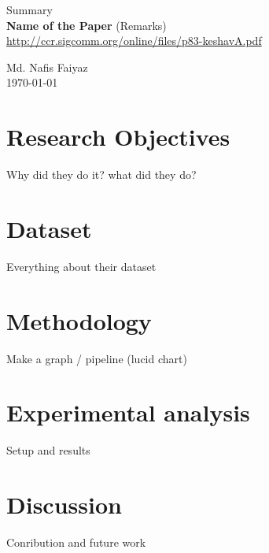 \documentclass{article}
\begin{document}
\begin{titlepage}

    \begin{center}
        
        {\LARGE
            Summary\\
            \vspace{0.5cm}
            \textbf{Name of the Paper} (Remarks)
        }\\
        \vspace{1cm}
        \url{http://ccr.sigcomm.org/online/files/p83-keshavA.pdf}
        
        \vfill
        
        {\large Md. Nafis Faiyaz}\\
        \today
        
    \end{center}
    
\end{titlepage}

\section{Research Objectives}
    Why did they do it? what did they do?
    
\section{Dataset}
    Everything about their dataset
    
\section{Methodology}
    Make a graph / pipeline (lucid chart)
    
\section{Experimental analysis}
    Setup and results
    
\section{Discussion}
    Conribution and future work
    
\end{document}
